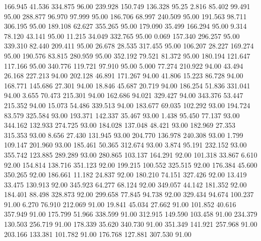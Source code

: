  166.945   41.536  334.875        96.00
 239.928  150.749  136.328        95.25
   2.816   85.402   99.491        95.00
 288.877   96.970   97.999        95.00
 186.706   68.997  240.509        95.00
 191.563   98.711  306.195        95.00
 189.108   62.627  355.265        95.00
 179.090   35.499  166.294        95.00
   9.314   78.120   43.141        95.00
  11.215   34.049  332.765        95.00
   0.069  157.340  296.257        95.00
 339.310   82.440  209.411        95.00
  26.678   28.535  317.455        95.00
 106.207   28.227  169.274        95.00
 190.576   83.815  280.959        95.00
 352.192   79.521   81.372        95.00
 180.194  121.647  117.166        95.00
 340.776  119.721   97.910        95.00
   5.000   77.274  210.922        94.00
  43.494   26.168  227.213        94.00
 202.128   46.891  171.267        94.00
  41.806   15.223   86.728        94.00
 168.771  145.686   27.301        94.00
  18.846   45.687   20.719        94.00
 186.254   51.836  331.041        94.00
   3.655   70.473  215.301        94.00
 162.686   94.021  329.427        94.00
 343.376   53.447  215.352        94.00
  15.073   54.486  339.513        94.00
 183.677   69.035  102.292        93.00
 194.724   83.579  325.584        93.00
 193.371  142.337   35.467        93.00
   1.438   95.450   77.137        93.00
 344.162  132.933  274.725        93.00
 184.028  137.048   48.421        93.00
 182.969   27.353  315.353        93.00
   8.656   27.430  131.945        93.00
 204.770  136.978  240.308        93.00
   1.799  109.147  201.960        93.00
 185.461   50.365  312.674        93.00
   3.874   95.191  232.152        93.00
 355.742  123.885  289.289        93.00
 280.865  103.137  164.291        92.00
 101.318   33.867    6.610        92.00
 154.814  138.716  351.123        92.00
 199.215  100.552  325.515        92.00
 176.384   45.600  350.265        92.00
 186.661   11.182   24.837        92.00
 180.210   74.151  327.426        92.00
  13.419   33.475  130.913        92.00
 345.923   64.277   68.124        92.00
 349.057   44.142  181.352        92.00
 184.401   88.498  328.873        92.00
 299.658   77.845   94.738        92.00
 329.434   94.674  100.237        91.00
   6.270   76.910  212.069        91.00
  19.841   45.034   27.662        91.00
 101.852   40.616  357.949        91.00
 175.799   51.966  338.599        91.00
 312.915  149.590  103.458        91.00
 234.379  130.503  256.719        91.00
 178.339   35.620  340.730        91.00
 351.349  141.921  257.968        91.00
 203.166  133.381  101.782        91.00
 176.768  127.881  307.530        91.00
